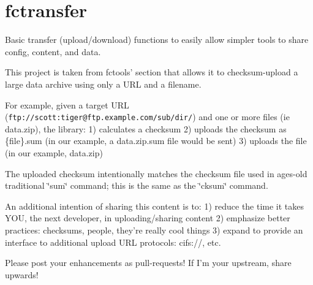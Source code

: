 \section*{fctransfer }

Basic transfer (upload/download) functions to easily allow simpler tools to share config, content, and data.

This project is taken from fctools' section that allows it to checksum-\/upload a large data archive using only a U\+R\+L and a filename.

For example, given a target U\+R\+L ({\tt ftp\+://scott\+:tiger@ftp.\+example.\+com/sub/dir/}) and one or more files (ie data.\+zip), the library\+: 1) calculates a checksum 2) uploads the checksum as \{file\}.sum (in our example, a data.\+zip.\+sum file would be sent) 3) uploads the file (in our example, data.\+zip)

The uploaded checksum intentionally matches the checksum file used in ages-\/old traditional \char`\"{}sum\char`\"{} command; this is the same as the \char`\"{}cksum\char`\"{} command.

An additional intention of sharing this content is to\+: 1) reduce the time it takes Y\+O\+U, the next developer, in uploading/sharing content 2) emphasize better practices\+: checksums, people, they're really cool things 3) expand to provide an interface to additional upload U\+R\+L protocols\+: cifs\+://, etc.

Please post your enhancements as pull-\/requests! If I'm your upstream, share upwards! 